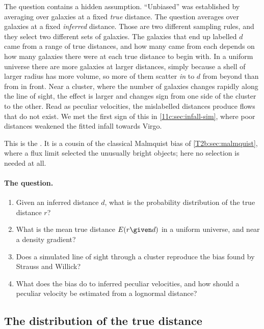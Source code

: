 The question contains a hidden assumption. ``Unbiased'' was established by
averaging over galaxies at a fixed \emph{true} distance. The question averages over
galaxies at a fixed \emph{inferred} distance. Those are two different sampling
rules, and they select two different sets of galaxies. The galaxies that end up
labelled $d$ came from a range of true distances, and how many came from each
depends on how many galaxies there were at each true distance to begin with. In a
uniform universe there are more galaxies at larger distances, simply because a
shell of larger radius has more volume, so more of them scatter \emph{in} to $d$ from
beyond than from in front. Near a cluster, where the number of galaxies changes
rapidly along the line of sight, the effect is larger and changes sign from one side
of the cluster to the other. Read as peculiar velocities, the mislabelled distances
produce flows that do not exist. We met the first sign of this in
\cref{11c:sec:infall-sim}, where poor distances weakened the fitted infall towards
Virgo.

This is the . It is a cousin of the classical
Malmquist bias of \cref{T2b:sec:malmquist}, where a flux limit selected the
unusually bright objects; here no selection is needed at all.

\paragraph{The question.}
\begin{enumerate}
  \item Given an inferred distance $d$, what is the probability distribution of the
        true distance $r$?
  \item What is the mean true distance $E(r\given d)$ in a uniform universe, and near a
        density gradient?
  \item Does a simulated line of sight through a cluster reproduce the bias found by
        Strauss and Willick?
  \item What does the bias do to inferred peculiar velocities, and how should a
        peculiar velocity be estimated from a lognormal distance?
\end{enumerate}

\subsection{The distribution of the true distance}
\label{11c:sec:ihm-bayes}

